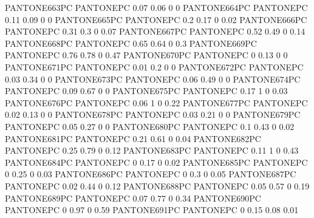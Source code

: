  {PANTONE663PC} {PANTONE\SpotSpace PC} {0.07 0.06 0 0}
 {PANTONE664PC} {PANTONE\SpotSpace PC} {0.11 0.09 0 0}
 {PANTONE665PC} {PANTONE\SpotSpace PC} {0.2 0.17 0 0.02}
 {PANTONE666PC} {PANTONE\SpotSpace PC} {0.31 0.3 0 0.07}
 {PANTONE667PC} {PANTONE\SpotSpace PC} {0.52 0.49 0 0.14}
 {PANTONE668PC} {PANTONE\SpotSpace PC} {0.65 0.64 0 0.3}
 {PANTONE669PC} {PANTONE\SpotSpace PC} {0.76 0.78 0 0.47}
 {PANTONE670PC} {PANTONE\SpotSpace PC} {0 0.13 0 0}
 {PANTONE671PC} {PANTONE\SpotSpace PC} {0.01 0.2 0 0}
 {PANTONE672PC} {PANTONE\SpotSpace PC} {0.03 0.34 0 0}
 {PANTONE673PC} {PANTONE\SpotSpace PC} {0.06 0.49 0 0}
 {PANTONE674PC} {PANTONE\SpotSpace PC} {0.09 0.67 0 0}
 {PANTONE675PC} {PANTONE\SpotSpace PC} {0.17 1 0 0.03}
 {PANTONE676PC} {PANTONE\SpotSpace PC} {0.06 1 0 0.22}
 {PANTONE677PC} {PANTONE\SpotSpace PC} {0.02 0.13 0 0}
 {PANTONE678PC} {PANTONE\SpotSpace PC} {0.03 0.21 0 0}
 {PANTONE679PC} {PANTONE\SpotSpace PC} {0.05 0.27 0 0}
 {PANTONE680PC} {PANTONE\SpotSpace PC} {0.1 0.43 0 0.02}
 {PANTONE681PC} {PANTONE\SpotSpace PC} {0.21 0.61 0 0.04}
 {PANTONE682PC} {PANTONE\SpotSpace PC} {0.25 0.79 0 0.12}
 {PANTONE683PC} {PANTONE\SpotSpace PC} {0.11 1 0 0.43}
 {PANTONE684PC} {PANTONE\SpotSpace PC} {0 0.17 0 0.02}
 {PANTONE685PC} {PANTONE\SpotSpace PC} {0 0.25 0 0.03}
 {PANTONE686PC} {PANTONE\SpotSpace PC} {0 0.3 0 0.05}
 {PANTONE687PC} {PANTONE\SpotSpace PC} {0.02 0.44 0 0.12}
 {PANTONE688PC} {PANTONE\SpotSpace PC} {0.05 0.57 0 0.19}
 {PANTONE689PC} {PANTONE\SpotSpace PC} {0.07 0.77 0 0.34}
 {PANTONE690PC} {PANTONE\SpotSpace PC} {0 0.97 0 0.59}
 {PANTONE691PC} {PANTONE\SpotSpace PC} {0 0.15 0.08 0.01}
